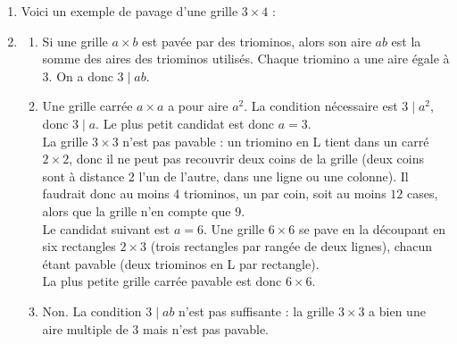 \begin{enumerate}
\item Voici un exemple de pavage d'une grille $3 \times 4$ :

\begin{center}
\end{center}


\item \begin{enumerate}
\item Si une grille $a \times b$ est pavée par des triominos, alors son aire $ab$ est la somme des aires des triominos utilisés. Chaque triomino a une aire égale à $3$. On a donc $3 \mid ab$.

\item Une grille carrée $a \times a$ a pour aire $a^2$. La condition nécessaire est $3 \mid a^2$, donc $3 \mid a$. Le plus petit candidat est donc $a = 3$. \\
La grille $3 \times 3$ n'est pas pavable : un triomino en L tient dans un carré $2 \times 2$, donc il ne peut pas recouvrir deux coins de la grille (deux coins sont à distance 2 l'un de l'autre, dans une ligne ou une colonne). Il faudrait donc au moins 4 triominos, un par coin, soit au moins $12$ cases, alors que la grille n'en compte que $9$. \\
Le candidat suivant est $a = 6$. Une grille $6 \times 6$ se pave en la découpant en six rectangles $2 \times 3$ (trois rectangles par rangée de deux lignes), chacun étant pavable (deux triominos en L par rectangle). \\
La plus petite grille carrée pavable est donc $\boxed{6 \times 6}$.

\item Non. La condition $3 \mid ab$ n'est pas suffisante : la grille $3 \times 3$ a bien une aire multiple de $3$ mais n'est pas pavable.
\end{enumerate}


\end{enumerate}
